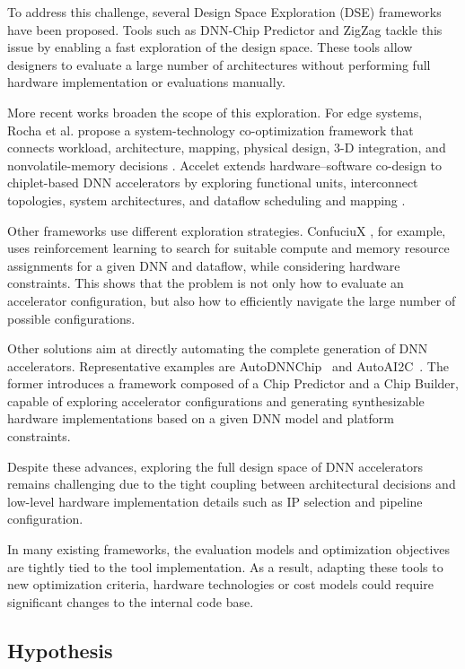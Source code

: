 To address this challenge, several Design Space Exploration (DSE)
frameworks have been
proposed. Tools such as DNN-Chip Predictor \cite{chippredictor} and
ZigZag \cite{zigzag} tackle this issue by enabling a fast exploration
of the design space.
These tools allow designers to evaluate a large number of
architectures without performing
full hardware implementation or evaluations manually.

More recent works broaden the scope of this exploration. For edge
systems, Rocha et al. propose a system-technology co-optimization
framework that connects workload, architecture, mapping, physical
design, 3-D integration, and nonvolatile-memory decisions
\cite{rocha2024stco}. Accelet extends hardware--software co-design to
chiplet-based DNN accelerators by exploring functional units,
interconnect topologies, system architectures, and dataflow scheduling
and mapping \cite{zheng2026accelet}.

Other frameworks use different exploration strategies. ConfuciuX
\cite{confuciux}, for example, uses reinforcement learning to search
for suitable compute and memory resource assignments for a given DNN
and dataflow, while considering hardware constraints. This shows that
the problem is not only how to evaluate an accelerator configuration,
but also how to efficiently navigate the large number of possible
configurations.

Other solutions aim at directly automating the complete
generation of DNN accelerators. Representative examples are
AutoDNNChip~\cite{autodnnchip} and AutoAI2C~\cite{autoai2c}. The former
introduces a framework composed of a Chip Predictor and a Chip
Builder, capable of exploring accelerator configurations and
generating synthesizable hardware implementations based on a given
DNN model and platform constraints.

Despite these advances, exploring the full design space of DNN
accelerators remains challenging due to the tight coupling between
architectural decisions and low-level hardware implementation details
such as IP selection and pipeline configuration.

In many existing frameworks, the evaluation models and optimization
objectives are tightly tied to the tool implementation. As a result,
adapting these tools to new optimization criteria, hardware
technologies or cost models could require significant changes to the
internal code base.

\subsection{Hypothesis}


